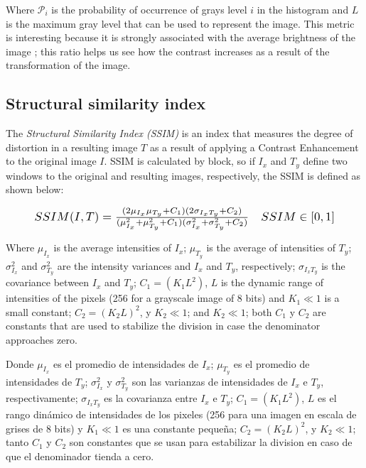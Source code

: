 \documentclass[spanish,twocolumn]{article}
\begin{document}
Where $\mathcal{P}_i$ is the probability of occurrence of grays level $i$ in the histogram and $L$ is the maximum gray level that can be used to represent the image. This metric is interesting because it is strongly associated with the average brightness of the image \cite{108593}; this ratio helps us see how the contrast increases as a result of the transformation of the image.

\subsection{Structural similarity index}
\label{ssec:ssim}

The {\it Structural Similarity Index (SSIM)} \cite{wang2004image} is an index that measures the degree of distortion in a resulting image $T$ as a result of applying a Contrast Enhancement to the original image $I$. SSIM is calculated by block, so if $I_x$ and $T_y$ define two windows to the original and resulting images, respectively, the SSIM is defined as shown below:

\begin{equation}\label{eq:ssim}
\resizebox{.9\hsize}{!}
{
$SSIM(I,T)=\frac{(2\mu_{I_x}\mu_{T_y}+C_1)(2\sigma_{I_xT_y}+C_2)}{(\mu_{I_x}^2+\mu_{T_y}^2+C_1)(\sigma_{I_x}^2+\sigma_{T_y}^2+C_2)} \quad SSIM \in [0,1]$
}
\end{equation}

Where $\mu_{I_x}$ is the average intensities of $I_x$; $\mu_{T_y}$ is the average of intensities of $T_y$; $\sigma_{I_x}^2$ and $\sigma_{T_y}^2$ are the intensity variances and $I_x$ and $T_y$, respectively; $\sigma_{I_x T_y}$ is the covariance between $I_x$ and $T_y$; $C_1=(K_1L^2)$, $L$ is the dynamic range of intensities of the pixels (256 for a grayscale image of 8 bits) and $K_1 \ll 1$ is a small constant; $C_2=(K_2 L)^2$, y $K_2 \ll 1$; and $K_2 \ll 1$; both $C_1$ y $C_2$ are constants that are used to stabilize the division in case the denominator approaches zero.


Donde $\mu_{I_x}$ es el promedio de intensidades de $I_x$; $\mu_{T_y}$ es el promedio de intensidades de $T_y$; $\sigma_{I_x}^2$ y $\sigma_{T_y}^2$ son las varianzas de intensidades de $I_x$ e $T_y$, respectivamente; $\sigma_{I_x T_y}$ es la covarianza entre $I_x$ e $T_y$; $C_1=(K_1L^2)$, $L$ es el rango dinámico de intensidades de los pixeles (256 para una imagen en escala de grises de 8 bits) y $K_1 \ll 1$ es una constante pequeña; $C_2=(K_2 L)^2$, y $K_2 \ll 1$; tanto $C_1$ y $C_2$ son constantes que se usan para estabilizar la division en caso de que el denominador tienda a cero.
\end{document}
